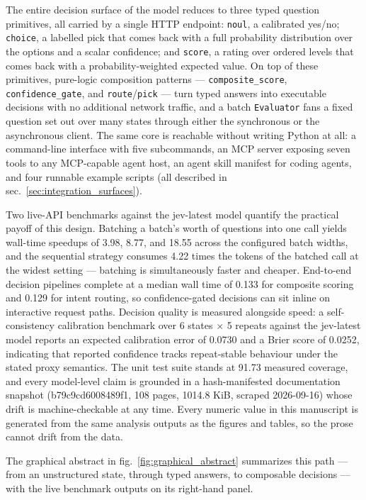 \documentclass[
  english,
]{article}
\begin{document}
The entire decision surface of the model reduces to three typed question
primitives, all carried by a single HTTP endpoint: \texttt{noul}, a
calibrated yes/no; \texttt{choice}, a labelled pick that comes back with
a full probability distribution over the options and a scalar
confidence; and \texttt{score}, a rating over ordered levels that comes
back with a probability-weighted expected value. On top of these
primitives, pure-logic composition patterns ---
\texttt{composite\_score}, \texttt{confidence\_gate}, and
\texttt{route}/\texttt{pick} --- turn typed answers into executable
decisions with no additional network traffic, and a batch
\texttt{Evaluator} fans a fixed question set out over many states
through either the synchronous or the asynchronous client. The same core
is reachable without writing Python at all: a command-line interface
with five subcommands, an MCP server exposing seven tools to any
MCP-capable agent host, an agent skill manifest for coding agents, and
four runnable example scripts (all described in
sec.~\ref{sec:integration_surfaces}).

Two live-API benchmarks against the jev-latest model quantify the
practical payoff of this design. Batching a batch's worth of questions
into one call yields wall-time speedups of 3.98, 8.77, and 18.55 across
the configured batch widths, and the sequential strategy consumes 4.22
times the tokens of the batched call at the widest setting --- batching
is simultaneously faster and cheaper. End-to-end decision pipelines
complete at a median wall time of 0.133 for composite scoring and 0.129
for intent routing, so confidence-gated decisions can sit inline on
interactive request paths. Decision quality is measured alongside speed:
a self-consistency calibration benchmark over 6 states \texorpdfstring{\ensuremath{\times}}{x} 5 repeats
against the jev-latest model reports an expected calibration error of
0.0730 and a Brier score of 0.0252, indicating that reported confidence
tracks repeat-stable behaviour under the stated proxy semantics. The
unit test suite stands at 91.73 measured coverage, and every model-level
claim is grounded in a hash-manifested documentation snapshot
(b79c9cd6008489f1, 108 pages, 1014.8 KiB, scraped 2026-09-16) whose
drift is machine-checkable at any time. Every numeric value in this
manuscript is generated from the same analysis outputs as the figures
and tables, so the prose cannot drift from the data.

The graphical abstract in fig.~\ref{fig:graphical_abstract} summarizes
this path --- from an unstructured state, through typed answers, to
composable decisions --- with the live benchmark outputs on its
right-hand panel.
\end{document}
